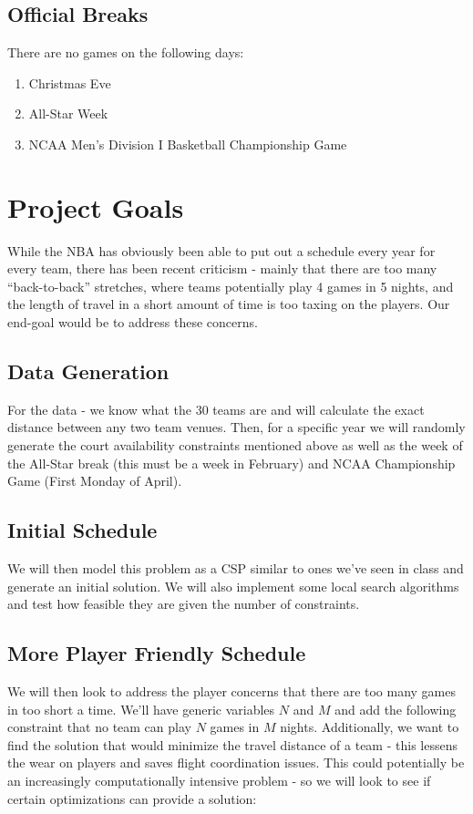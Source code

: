 \documentclass{article}
\begin{document}
	\subsection{Official Breaks}

	There are no games on the following days:

	\begin{enumerate}
		\item Christmas Eve
		\item All-Star Week
		\item NCAA Men's Division I Basketball Championship Game
	\end{enumerate}	
	
	\section{Project Goals}

	While the NBA has obviously been able to put out a schedule every year for every team, there has been recent criticism - mainly that there are too many ``back-to-back'' stretches, where teams potentially play 4 games in 5 nights, and the length of travel in a short amount of time is too taxing on the players. Our end-goal would be to address these concerns.
	
	\subsection{Data Generation}
	For the data - we know what the 30 teams are and will calculate the exact distance between any two team venues. Then, for a specific year we will randomly generate the court availability constraints mentioned above as well as the week of the All-Star break (this must be a week in February) and NCAA Championship Game (First Monday of April).

	\subsection{Initial Schedule}
	We will then model this problem as a CSP similar to ones we've seen in class and generate an initial solution. We will also implement some local search algorithms and test how feasible they are given the number of constraints. 

	\subsection{More Player Friendly Schedule}
	We will then look to address the player concerns that there are too many games in too short a time. We'll have generic variables $N$ and $M$ and add the following constraint that no team can play $N$ games in $M$ nights.  Additionally, we want to find the solution that would minimize the travel distance of a team - this lessens the wear on players and saves flight coordination issues. This could potentially be an increasingly computationally intensive problem - so we will look to see if certain optimizations can provide a solution:
\end{document}
